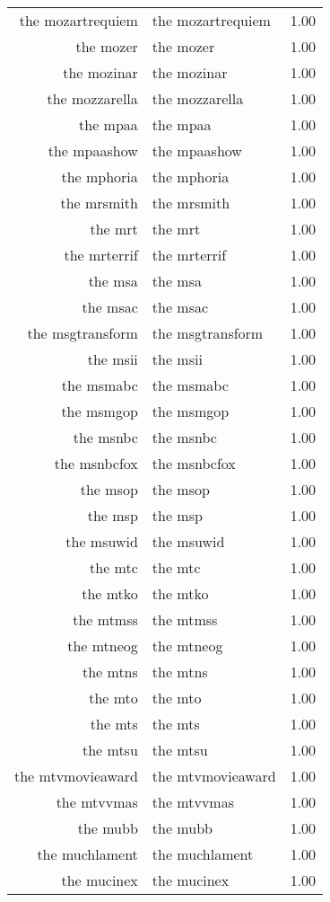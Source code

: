 \begin{table}[ht]
\begin{tabular}{rlr}
  the mozartrequiem & the mozartrequiem & 1.00 \\ 
  the mozer & the mozer & 1.00 \\ 
  the mozinar & the mozinar & 1.00 \\ 
  the mozzarella & the mozzarella & 1.00 \\ 
  the mpaa & the mpaa & 1.00 \\ 
  the mpaashow & the mpaashow & 1.00 \\ 
  the mphoria & the mphoria & 1.00 \\ 
  the mrsmith & the mrsmith & 1.00 \\ 
  the mrt & the mrt & 1.00 \\ 
  the mrterrif & the mrterrif & 1.00 \\ 
  the msa & the msa & 1.00 \\ 
  the msac & the msac & 1.00 \\ 
  the msgtransform & the msgtransform & 1.00 \\ 
  the msii & the msii & 1.00 \\ 
  the msmabc & the msmabc & 1.00 \\ 
  the msmgop & the msmgop & 1.00 \\ 
  the msnbc & the msnbc & 1.00 \\ 
  the msnbcfox & the msnbcfox & 1.00 \\ 
  the msop & the msop & 1.00 \\ 
  the msp & the msp & 1.00 \\ 
  the msuwid & the msuwid & 1.00 \\ 
  the mtc & the mtc & 1.00 \\ 
  the mtko & the mtko & 1.00 \\ 
  the mtmss & the mtmss & 1.00 \\ 
  the mtneog & the mtneog & 1.00 \\ 
  the mtns & the mtns & 1.00 \\ 
  the mto & the mto & 1.00 \\ 
  the mts & the mts & 1.00 \\ 
  the mtsu & the mtsu & 1.00 \\ 
  the mtvmovieaward & the mtvmovieaward & 1.00 \\ 
  the mtvvmas & the mtvvmas & 1.00 \\ 
  the mubb & the mubb & 1.00 \\ 
  the muchlament & the muchlament & 1.00 \\ 
  the mucinex & the mucinex & 1.00 \\ 

\end{tabular}
\end{table}
